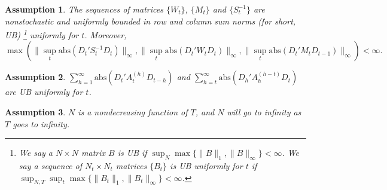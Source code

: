 \documentclass[11pt,a4paper]{article}
\newtheorem{assumption}{Assumption}
\begin{document}
\begin{assumption}\label{asp_UB}
The sequences of matrices $\{W_t\}$, $\{M_t\}$ and $\{S_t^{-1}\}$ are nonstochastic and uniformly bounded in row and column sum norms (for short, UB)
\footnote{We say a $N\times N$ matrix $B$ is UB if $\sup_{N}\max\{\|B\|_1,\|B\|_\infty\}<\infty$. We say a sequence of $N_t\times N_t$ matrices $\{B_{t}\}$ is UB uniformly for $t$ if $\sup_{N,T}\sup_t\max\{\|B_{t}\|_1,\|B_{t}\|_\infty\}<\infty$.}
uniformly for $t$. Moreover,$$\max(\|\sup_t \mathrm{abs}(D_t'S_t^{-1}D_t)\|_\infty,\|\sup_t \mathrm{abs}(D_t'W_tD_t)\|_\infty,\|\sup_t \mathrm{abs}(D_t'M_tD_{t-1})\|_\infty)<\infty.$$
\end{assumption}
\begin{assumption}\label{asp_UBA}
$\sum_{h=1}^{\infty}\mathrm{abs}\left(D_t'A_{t}^{(h)}D_{t-h}\right)$ and $\sum_{h=t}^{\infty}\mathrm{abs}\left(D_h'A_{h}^{(h-t)}D_t\right)$ are UB uniformly for $t$.
\end{assumption}
\begin{assumption}\label{asp_n}
$N$ is a nondecreasing function of $T$, and $N$ will go to infinity as $T$ goes to infinity.
\end{assumption}
\end{document}
